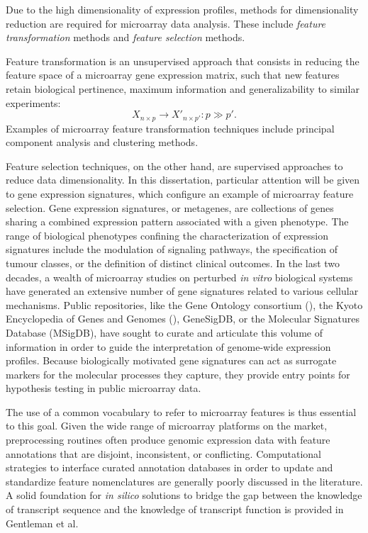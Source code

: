 Due to the high dimensionality of expression profiles, methods for
dimensionality reduction are required for microarray data analysis.  These
include \emph{feature transformation} methods and \emph{feature selection}
methods.\cite{haibe-kains_identification_2009}

Feature transformation is an unsupervised approach that consists in reducing the
feature space of a microarray gene expression matrix, such that new features
retain biological pertinence, maximum information and generalizability to
similar experiments:
\begin{equation}
  \label{eq:feature-transformation}
  X_{n \times p} \to X'_{n \times p'} : p \gg p'.
\end{equation}
Examples of microarray feature transformation techniques include principal
component analysis and clustering methods.

Feature selection techniques, on the other hand, are supervised approaches to
reduce data dimensionality.  In this dissertation, particular attention will be
given to gene expression signatures, which configure an example of microarray
feature selection.  Gene expression signatures, or metagenes, are collections of
genes sharing a combined expression pattern associated with a given phenotype.
The range of biological phenotypes confining the characterization of expression
signatures include the modulation of signaling pathways,\cite{itadani_can_2008}
the specification of tumour classes,\cite{ramaswamy_multiclass_2001} or the
definition of distinct clinical outcomes.\cite{vant_veer_gene_2002} In the last
two decades, a wealth of microarray studies on perturbed \emph{in vitro}
biological systems have generated an extensive number of gene signatures related
to various cellular mechanisms.\cite{chibon_cancer_2013} Public repositories,
like the Gene Ontology consortium (),\cite{ashburner_gene_2000}
the Kyoto Encyclopedia of Genes and Genomes
(),\cite{kanehisa_kegg:_2000}
\mbox{GeneSigDB},\cite{culhane_genesigdb:_2012} or the Molecular Signatures
Database (\mbox{MSigDB}),\cite{subramanian_gene_2005} have sought to curate and
articulate this volume of information in order to guide the interpretation of
genome-wide expression profiles.  Because biologically motivated gene signatures
can act as surrogate markers for the molecular processes they capture, they
provide entry points for hypothesis testing in public microarray data.

The use of a common vocabulary to refer to microarray features is thus essential
to this goal.  Given the wide range of microarray platforms on the market,
preprocessing routines often produce genomic expression data with feature
annotations that are disjoint, inconsistent, or conflicting.  Computational
strategies to interface curated annotation databases in order to update and
standardize feature nomenclatures are generally poorly discussed in the
literature.  A solid foundation for \emph{in silico} solutions to bridge the gap
between the knowledge of transcript sequence and the knowledge of transcript
function is provided in Gentleman et al.\cite{gentleman_bioinformatics_2006}

